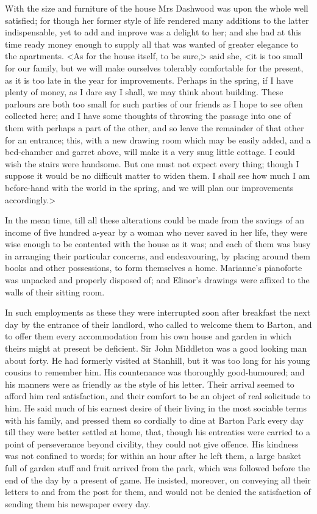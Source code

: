 With the size and furniture of the house Mrs Dashwood was upon the whole well satisfied; for though her former style of life rendered many additions to the latter indispensable, yet to add and improve was a delight to her; and she had at this time ready money enough to supply all that was wanted of greater elegance to the apartments. <As for the house itself, to be sure,> said she, <it is too small for our family, but we will make ourselves tolerably comfortable for the present, as it is too late in the year for improvements. Perhaps in the spring, if I have plenty of money, as I dare say I shall, we may think about building. These parlours are both too small for such parties of our friends as I hope to see often collected here; and I have some thoughts of throwing the passage into one of them with perhaps a part of the other, and so leave the remainder of that other for an entrance; this, with a new drawing room which may be easily added, and a bed-chamber and garret above, will make it a very snug little cottage. I could wish the stairs were handsome. But one must not expect every thing; though I suppose it would be no difficult matter to widen them. I shall see how much I am before-hand with the world in the spring, and we will plan our improvements accordingly.>

In the mean time, till all these alterations could be made from the savings of an income of five hundred a-year by a woman who never saved in her life, they were wise enough to be contented with the house as it was; and each of them was busy in arranging their particular concerns, and endeavouring, by placing around them books and other possessions, to form themselves a home. Marianne's pianoforte was unpacked and properly disposed of; and Elinor's drawings were affixed to the walls of their sitting room.

In such employments as these they were interrupted soon after breakfast the next day by the entrance of their landlord, who called to welcome them to Barton, and to offer them every accommodation from his own house and garden in which theirs might at present be deficient. Sir John Middleton was a good looking man about forty. He had formerly visited at Stanhill, but it was too long for his young cousins to remember him. His countenance was thoroughly good-humoured; and his manners were as friendly as the style of his letter. Their arrival seemed to afford him real satisfaction, and their comfort to be an object of real solicitude to him. He said much of his earnest desire of their living in the most sociable terms with his family, and pressed them so cordially to dine at Barton Park every day till they were better settled at home, that, though his entreaties were carried to a point of perseverance beyond civility, they could not give offence. His kindness was not confined to words; for within an hour after he left them, a large basket full of garden stuff and fruit arrived from the park, which was followed before the end of the day by a present of game. He insisted, moreover, on conveying all their letters to and from the post for them, and would not be denied the satisfaction of sending them his newspaper every day.

